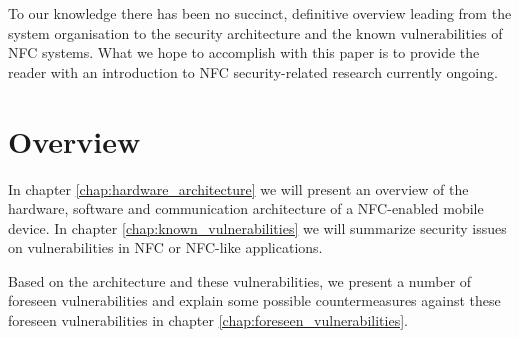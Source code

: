 To our knowledge there has been no succinct, definitive overview leading from the system organisation to the security architecture and the known vulnerabilities of NFC systems.
What we hope to accomplish with this paper is to provide the reader with an introduction to NFC security-related research currently ongoing.

\newpage

\section{Overview}
In chapter \ref{chap:hardware_architecture} we will present an overview of the hardware, software and communication architecture of a NFC-enabled mobile device.
In chapter \ref{chap:known_vulnerabilities} we will summarize security issues on vulnerabilities in NFC or NFC-like applications.

Based on the architecture and these vulnerabilities, we present a number of foreseen vulnerabilities and explain some possible countermeasures against these foreseen vulnerabilities in chapter \ref{chap:foreseen_vulnerabilities}.


